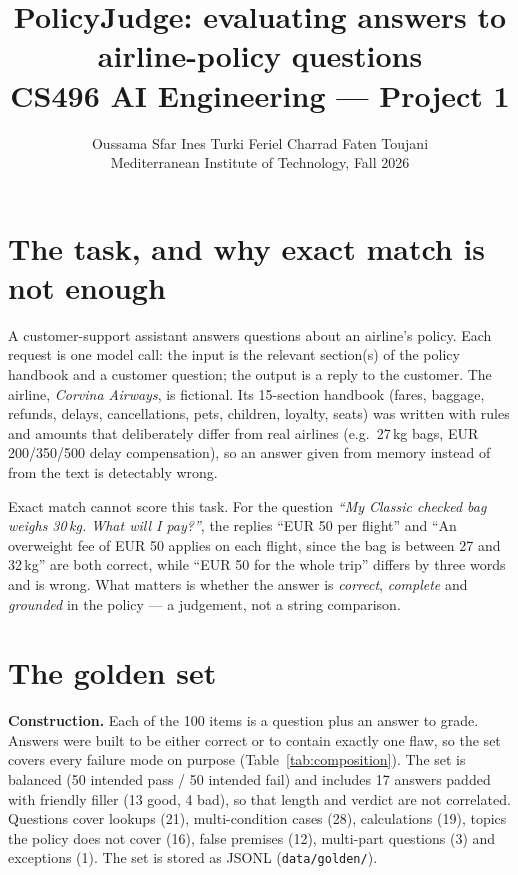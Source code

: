 \documentclass[10pt,a4paper]{article}
\title{\vspace{-1.2cm}\textbf{PolicyJudge: evaluating answers to airline-policy questions}\\[2pt]
\large CS496 AI Engineering --- Project 1}
\author{Oussama Sfar \quad Ines Turki \quad Feriel Charrad \quad Faten Toujani \\[2pt]
Mediterranean Institute of Technology, Fall 2026}
\date{\vspace{-0.6cm}}
\newcommand{\code}[1]{\texttt{#1}}
\begin{document}
\maketitle

\section{The task, and why exact match is not enough}

A customer-support assistant answers questions about an airline's policy. Each request is one model call: the input is the relevant section(s) of the policy handbook and a customer question; the output is a reply to the customer. The airline, \emph{Corvina Airways}, is fictional. Its 15-section handbook (fares, baggage, refunds, delays, cancellations, pets, children, loyalty, seats) was written with rules and amounts that deliberately differ from real airlines (e.g.\ 27\,kg bags, EUR 200/350/500 delay compensation), so an answer given from memory instead of from the text is detectably wrong.

Exact match cannot score this task. For the question \emph{``My Classic checked bag weighs 30\,kg. What will I pay?''}, the replies ``EUR 50 per flight'' and ``An overweight fee of EUR 50 applies on each flight, since the bag is between 27 and 32\,kg'' are both correct, while ``EUR 50 for the whole trip'' differs by three words and is wrong. What matters is whether the answer is \emph{correct}, \emph{complete} and \emph{grounded} in the policy --- a judgement, not a string comparison.

\section{The golden set}

\textbf{Construction.} Each of the 100 items is a question plus an answer to grade. Answers were built to be either correct or to contain exactly one flaw, so the set covers every failure mode on purpose (Table~\ref{tab:composition}). The set is balanced (50 intended pass / 50 intended fail) and includes 17 answers padded with friendly filler (13 good, 4 bad), so that length and verdict are not correlated. Questions cover lookups (21), multi-condition cases (28), calculations (19), topics the policy does not cover (16), false premises (12), multi-part questions (3) and exceptions (1). The set is stored as JSONL (\code{data/golden/}).
\end{document}
